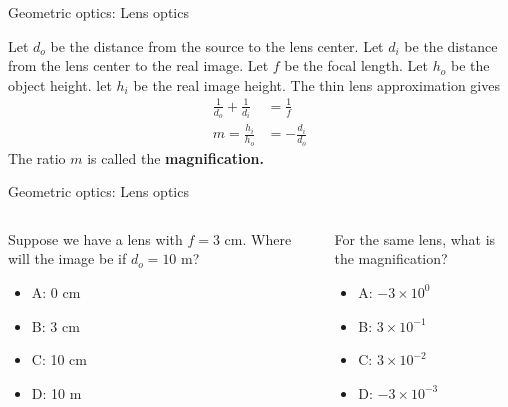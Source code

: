 \documentclass{beamer}
\begin{document}
\begin{frame}{Geometric optics: Lens optics}
\begin{tcolorbox}[colback=white,colframe=black!40!black,title=Thin Lens Equations]
\alert{Let $d_o$ be the distance from the source to the lens center.  Let $d_i$ be the distance from the lens center to the real image.  Let $f$ be the focal length.  Let $h_o$ be the object height.  let $h_i$ be the real image height.  The thin lens approximation gives
\begin{align}
\frac{1}{d_o} + \frac{1}{d_i} &= \frac{1}{f} \\
m = \frac{h_i}{h_o} &= -\frac{d_i}{d_o}
\end{align}
The ratio $m$ is called the \textbf{magnification.}
}
\end{tcolorbox}
\end{frame}

\begin{frame}{Geometric optics: Lens optics}
\begin{columns}[T]
\begin{column}{0.5\textwidth}
Suppose we have a lens with $f = 3$ cm.  Where will the image be if $d_o = 10$ m?
\begin{itemize}
\item A: 0 cm
\item B: 3 cm
\item C: 10 cm
\item D: 10 m
\end{itemize}
\end{column}
\begin{column}{0.5\textwidth}
For the same lens, what is the magnification?
\begin{itemize}
\item A: $-3 \times 10^{0}$
\item B: $3 \times 10^{-1}$
\item C: $3 \times 10^{-2}$
\item D: $-3 \times 10^{-3}$
\end{itemize}
\end{column}
\end{columns}
\end{frame}
\end{document}
